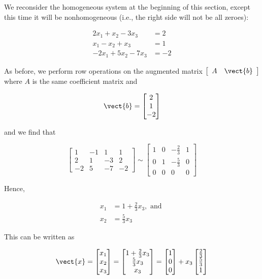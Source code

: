 \begin{example} We reconsider the homogeneous system at the beginning of this section, except this time it will be nonhomogeneous (i.e., the right side will not be all zeroes):

\[
\begin{aligned}
2 x_1 + x_2 - 3 x_3 & = 2 \\
x_1 - x_2 + x_3 & = 1 \\
-2 x_1 + 5 x_2 - 7 x_3 & = -2
\end{aligned}
\]

As before, we perform row operations on the augmented matrix \(\left[\begin{array}{cc} A & \vect{b} \end{array}\right]\) where \( A \) is the same coefficient matrix and

\[
\vect{b} = \begin{bmatrix}
2 \\
1 \\
-2
\end{bmatrix}
\]

and we find that

\[
\left[\begin{array}{cccc}
1 & -1 & 1 & 1 \\
2 & 1 & -3 & 2 \\
-2 & 5 & -7 & -2
\end{array}\right]
\sim
\left[\begin{array}{cccc}
1 & 0 & -\frac{2}{3} & 1 \\
0 & 1 & -\frac{5}{3} & 0 \\
0 & 0 & 0 & 0
\end{array}\right]
\]

Hence,

\[
\begin{aligned}
x_1 &= 1 + \frac{2}{3} x_3, \text{ and } \\
x_2 &= \frac{5}{3} x_3
\end{aligned}
\]

This can be written as

\[
\vect{x} = \begin{bmatrix}
x_1 \\
x_2 \\
x_3
\end{bmatrix} =
\begin{bmatrix}
1 + \frac{2}{3} x_3 \\
\frac{5}{3} x_3 \\
x_3
\end{bmatrix}
= \begin{bmatrix}
1 \\
0 \\
0
\end{bmatrix} + x_3 \begin{bmatrix}
\frac{2}{3} \\
\frac{5}{3} \\
1
\end{bmatrix}
\]


\end{example}
